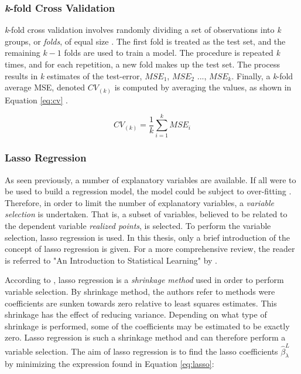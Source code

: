 \subsubsection{\textit{k}-fold Cross Validation}
\textit{k}-fold cross validation involves randomly dividing a set of observations into \textit{k} groups, or \textit{folds}, of equal size \citep{ISLR}. The first fold is treated as the test set, and the remaining $k-1$ folds are used to train a model. The procedure is repeated \textit{k} times, and for each repetition, a new fold makes up the test set. The process results in \textit{k} estimates of the test-error, $MSE_1$, $MSE_2$ ..., $MSE_k$. Finally, a \textit{k}-fold average MSE, denoted $CV_{(k)}$ is computed by averaging the values, as shown in Equation \ref{eq:cv} \citep{ISLR}.

\begin{equation}\label{eq:cv}
    CV_{(k)} = \frac{1}{k}\sum_{i=1}^{k} MSE_i
\end{equation}

\subsubsection{Lasso Regression}

As seen previously, a number of explanatory variables are available. If all were to be used to build a regression model, the model could be subject to over-fitting \citep{ISLR}. Therefore, in order to limit the number of explanatory variables, a \textit{variable selection} is undertaken. That is, a subset of variables, believed to be related to the dependent variable \textit{realized points}, is selected. To perform the variable selection, lasso regression is used. In this thesis, only a brief introduction of the concept of lasso regression is given. For a more comprehensive review, the reader is referred to "An Introduction to Statistical Learning" by \cite{ISLR}.

\newpar

According to \cite{ISLR}, lasso regression is a \textit{shrinkage method} used in order to perform variable selection. By shrinkage method, the authors refer to methods were coefficients are sunken towards zero relative to least squares estimates. This shrinkage has the effect of reducing variance. Depending on what type of shrinkage is performed, some of the coefficients may be estimated to be exactly zero. Lasso regression is such a shrinkage method and can therefore perform a variable selection. The aim of lasso regression is to find the lasso coefficients $\hat{\beta}_{\lambda}^{L}$ by minimizing the expression found in Equation \ref{eq:lasso}:

